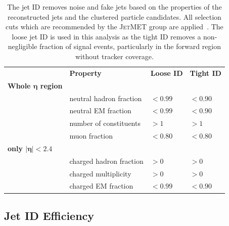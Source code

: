 \begin{table}[htbp]
    \centering
    \caption[Jet ID criteria]{The jet ID removes noise and fake jets based on
        the properties of the reconstructed jets and the clustered particle
        candidates. All selection cuts which are recommended by the
        \textsc{JetMET} group are applied~\cite{jetmet:jetid}. The loose jet ID is
        used in this analysis as the tight ID removes a non-negligible fraction
        of signal events, particularly in the forward region without tracker
        coverage.}
    \label{tab:jetid}
    \begin{tabular}{llll}
    \toprule
                                 & \textbf{Property}       & \textbf{Loose ID} & \textbf{Tight ID}\\\cmidrule(lr){2-4}
                                 \textbf{Whole $\bm{\eta}$ region} &                         &                   & \\\cmidrule(lr){1-1}
                                 & neutral hadron fraction & $< 0.99$          & $< 0.90$\\
                                 & neutral EM fraction     & $< 0.99$          & $< 0.90$\\
                                 & number of constituents  & $> 1$             & $> 1$\\
                                 & muon fraction           & $< 0.80$           & $< 0.80$\\
                                 \textbf{only $\bm{|\eta| < 2.4}$} &                         &                   & \\\cmidrule(lr){1-1}
                                 & charged hadron fraction & $> 0$             & $> 0$\\
                                 & charged multiplicity    & $> 0$             & $> 0$\\
                                 & charged EM fraction     & $< 0.99$          & $< 0.90$\\
    \bottomrule
    \end{tabular}
\end{table}


\subsection{Jet ID Efficiency}

